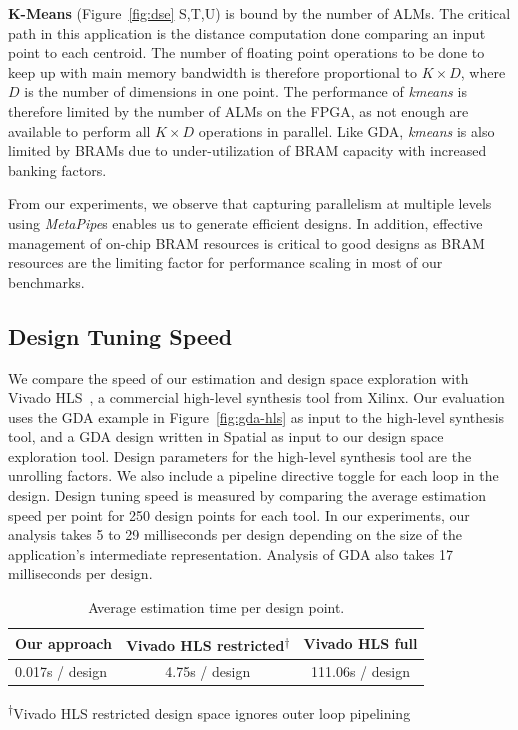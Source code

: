 \textbf{K-Means} (Figure~\ref{fig:dse} S,T,U) is bound by the number of ALMs. The critical path in this application is the distance computation done comparing an input point to each centroid.
The number of floating point operations to be done to keep up with main memory bandwidth is therefore proportional to $K \times D$, where $D$ is the number of dimensions in one point.
The performance of \emph{kmeans} is therefore limited by the number of ALMs on the FPGA, as not enough are available to perform all $K \times D$ operations in parallel.
Like GDA, \emph{kmeans} is also limited by BRAMs due to under-utilization of BRAM capacity with increased banking factors.

From our experiments, we observe that capturing parallelism at multiple levels using \emph{MetaPipe}s enables us to generate
efficient designs. In addition, effective management of on-chip BRAM resources is critical to good designs
as BRAM resources are the limiting factor for performance scaling in most of our benchmarks.

\subsection{Design Tuning Speed}
We compare the speed of our estimation and design space exploration with
Vivado HLS~\cite{vivadohls}, a commercial high-level synthesis tool from Xilinx.
Our evaluation uses the GDA example in Figure~\ref{fig:gda-hls} as input to the high-level synthesis tool, and a GDA design written in Spatial as input to our design space exploration tool. Design parameters
for the high-level synthesis tool are the unrolling factors. We also include a pipeline directive
toggle for each loop in the design. Design tuning speed
is measured by comparing the average estimation speed per point for 250 design points for each tool.
In our experiments, our analysis takes 5 to 29 milliseconds per design depending on the size of the application's intermediate representation. Analysis of GDA also takes 17 milliseconds per design.

\begin{table}
\centering\footnotesize
\begin{tabular}{lcc}
\toprule
{\bf Our approach}  & {\bf Vivado HLS restricted\textsuperscript{$\dagger$}} & {\bf Vivado HLS full} \\ \midrule
0.017s / design     & 4.75s / design               & 111.06s / design      \\ \midrule
\end{tabular}

\vspace{5pt}
\textsuperscript{$\dagger$}Vivado HLS restricted design space ignores outer loop pipelining
\caption{Average estimation time per design point.}
\label{t:speeds}
\end{table}

